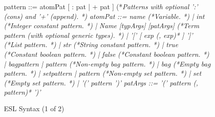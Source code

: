 \documentclass[5p,times]{elsarticle}
\begin{document}
\begin{figure}
\begin{ESL}
pattern ::= atomPat [ : pat | + pat ]                            (*\rmfamily\it Patterns with optional ':' (cons) and '+' (append). *)
atomPat ::= name                                                 (*\rmfamily\it Variable. *)
        |  int                                                  (*\rmfamily\it Integer constant pattern. *)
        |  Name [typArgs] [patArgs]                             (*\rmfamily\it Term pattern (with optional generic types). *)
        |  '[' [ exp (, exp)* ] ']'                             (*\rmfamily\it List pattern. *)
        |  str                                                  (*\rmfamily\it String constant pattern. *)
        |  true                                                 (*\rmfamily\it Constant boolean pattern. *)
        |  false                                                (*\rmfamily\it Constant boolean pattern. *)
        |  bag{pattern | pattern}                               (*\rmfamily\it Non-empty bag pattern. *)
        |  bag{}                                                (*\rmfamily\it Empty bag pattern. *)
        |  set{pattern | pattern}                               (*\rmfamily\it Non-empty set pattern. *)
        |  set{}                                                (*\rmfamily\it Empty set pattern. *)
        |  '(' pattern ')'
patArgs ::= '(' pattern (, pattern)* ')' 
\end{ESL}
\caption{ESL Syntax (1 of 2)}
\label{fig:ESL_syntax_1}
\end{figure}
\end{document}
